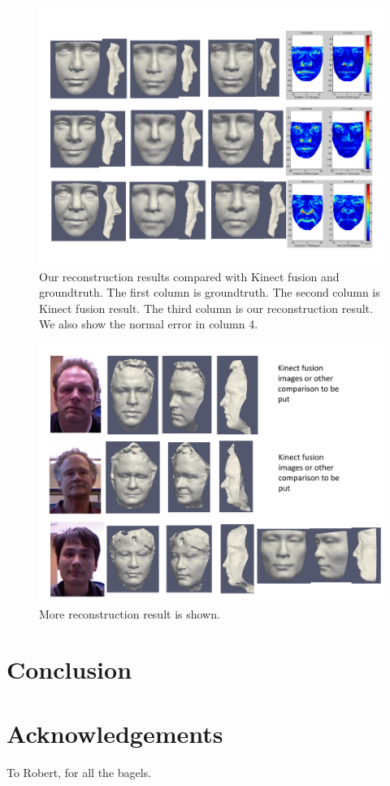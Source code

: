 \documentclass[annual]{acmsiggraph}
\begin{document}
\begin{figure}[htb]
  \centering
  \includegraphics[width=7.5in]{images/reconstruction_error}
  \caption{Our reconstruction results compared with Kinect fusion and groundtruth. The first column is groundtruth. The second column is Kinect fusion result. The third column is our reconstruction result. We also show the normal error in column 4.}\label{reconstructionerror}
\end{figure}

\begin{figure}[htb]
  \centering
  \includegraphics[width=7.5in]{images/otherresult}
  \caption{More reconstruction result is shown.}\label{otherresult}
\end{figure}

\section{Conclusion}


\section*{Acknowledgements}

To Robert, for all the bagels.



\end{document}
